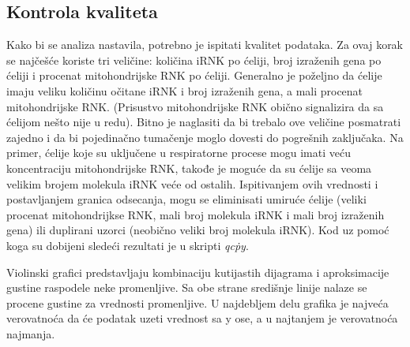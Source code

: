 \documentclass{article}
\begin{document}
\subsection{Kontrola kvaliteta}

Kako bi se analiza nastavila, potrebno je ispitati kvalitet podataka. Za ovaj korak se najčešće koriste tri veličine: količina iRNK po ćeliji, broj izraženih gena po ćeliji i procenat mitohondrijske RNK po ćeliji\cite{luecken2019current}. Generalno je poželjno da ćelije imaju veliku količinu očitane iRNK i broj izraženih gena, a mali procenat mitohondrijske RNK. (Prisustvo mitohondrijske RNK obično signalizira da sa ćelijom nešto nije u redu\cite{ilicic2016classification}). Bitno je naglasiti da bi trebalo ove veličine posmatrati zajedno i da bi pojedinačno tumačenje moglo dovesti do pogrešnih zaključaka. Na primer, ćelije koje su uključene u respiratorne procese mogu imati veću koncentraciju mitohondrijske RNK, takođe je moguće da su ćelije sa veoma velikim brojem molekula iRNK veće od ostalih. Ispitivanjem ovih vrednosti i postavljanjem granica odsecanja, mogu se eliminisati umiruće ćelije (veliki procenat mitohondrijkse RNK, mali broj molekula iRNK i mali broj izraženih gena) ili duplirani uzorci (neobično veliki broj molekula iRNK). Kod uz pomoć koga su dobijeni sledeći rezultati je u skripti \emph{qc\.py}.

Violinski grafici predstavljaju kombinaciju kutijastih dijagrama i aproksimacije gustine raspodele neke promenljive. Sa obe strane središnje linije nalaze se procene gustine za vrednosti promenljive. U najdebljem delu grafika je najveća verovatnoća da će podatak uzeti vrednost sa y ose, a u najtanjem je verovatnoća najmanja.
\end{document}
